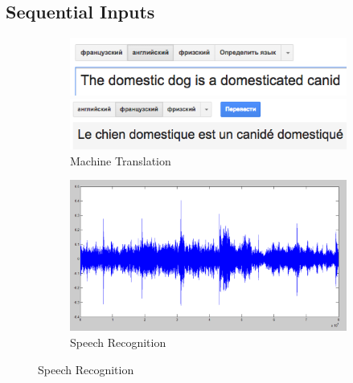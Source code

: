 \documentclass{beamer}
\begin{document}
	\subsection*{Sequential Inputs}
	\begin{frame}			
			\begin{figure}
				\begin{subfigure}{.49\textwidth}
					\centering				\includegraphics[scale=0.35]{img/transl1} 
		
					\hspace{0.60cm}\includegraphics[scale=0.35]{img/transl2}
					\caption{Machine Translation }
				\end{subfigure}
				\begin{subfigure}{.49\textwidth}
					\vspace{0.2cm}
					\centering \includegraphics[scale=0.15]{img/audio} 
					\caption{Speech Recognition}
				\end{subfigure}
				
				\vspace{0.2cm}
				

\end{figure}
\end{frame}
\end{document}
